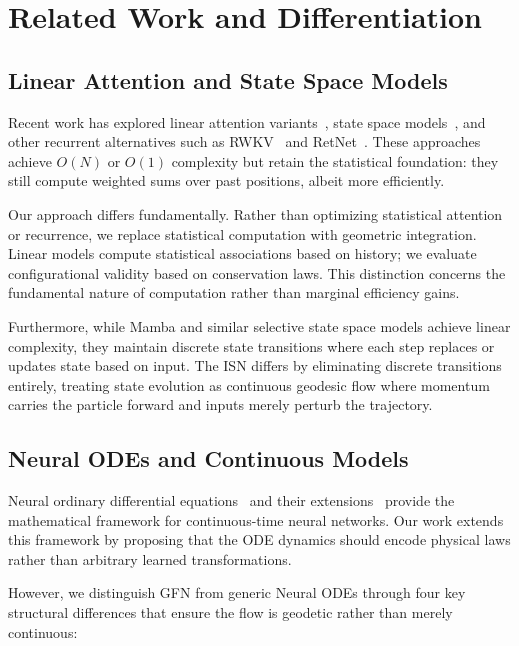 \documentclass[12pt,a4paper]{article}
\begin{document}
\section{Related Work and Differentiation}
\label{sec:related-work}

\subsection{Linear Attention and State Space Models}
\label{sec:linear-attention}

Recent work has explored linear attention variants~\cite{katharopoulos2020}, state space models~\cite{gu2020, gu2023}, and other recurrent alternatives such as RWKV~\cite{peng2023} and RetNet~\cite{sun2023}. These approaches achieve $O(N)$ or $O(1)$ complexity but retain the statistical foundation: they still compute weighted sums over past positions, albeit more efficiently.

Our approach differs fundamentally. Rather than optimizing statistical attention or recurrence, we replace statistical computation with geometric integration. Linear models compute statistical associations based on history; we evaluate configurational validity based on conservation laws. This distinction concerns the fundamental nature of computation rather than marginal efficiency gains.

Furthermore, while Mamba and similar selective state space models achieve linear complexity, they maintain discrete state transitions where each step replaces or updates state based on input. The ISN differs by eliminating discrete transitions entirely, treating state evolution as continuous geodesic flow where momentum carries the particle forward and inputs merely perturb the trajectory.

\subsection{Neural ODEs and Continuous Models}
\label{sec:neural-odes}

Neural ordinary differential equations~\cite{chen2018} and their extensions~\cite{dupont2019} provide the mathematical framework for continuous-time neural networks. Our work extends this framework by proposing that the ODE dynamics should encode physical laws rather than arbitrary learned transformations.

However, we distinguish GFN from generic Neural ODEs through four key structural differences that ensure the flow is geodetic rather than merely continuous:
\end{document}
